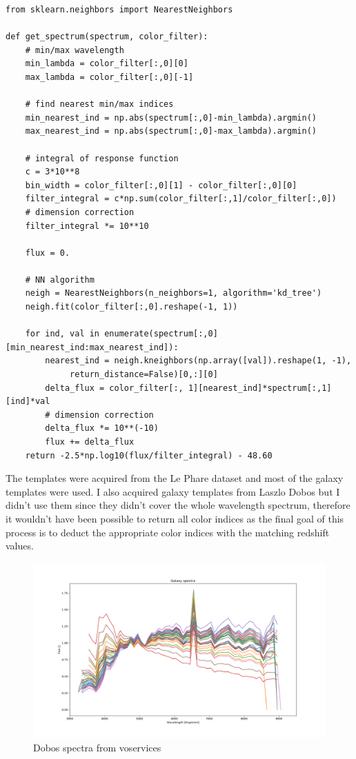 \documentclass[a4paper,12pt]{article}
\begin{document}
\lstset{language=Python}
\lstset{frame=lines}
\lstset{basicstyle=\scriptsize}
\begin{lstlisting}
from sklearn.neighbors import NearestNeighbors

def get_spectrum(spectrum, color_filter):
	# min/max wavelength
	min_lambda = color_filter[:,0][0]
	max_lambda = color_filter[:,0][-1]
		
	# find nearest min/max indices
	min_nearest_ind = np.abs(spectrum[:,0]-min_lambda).argmin()
	max_nearest_ind = np.abs(spectrum[:,0]-max_lambda).argmin()
		
	# integral of response function
	c = 3*10**8
	bin_width = color_filter[:,0][1] - color_filter[:,0][0]
	filter_integral = c*np.sum(color_filter[:,1]/color_filter[:,0])
	# dimension correction
	filter_integral *= 10**10
		
	flux = 0.
		
	# NN algorithm
	neigh = NearestNeighbors(n_neighbors=1, algorithm='kd_tree')
	neigh.fit(color_filter[:,0].reshape(-1, 1))
		
	for ind, val in enumerate(spectrum[:,0][min_nearest_ind:max_nearest_ind]):
		nearest_ind = neigh.kneighbors(np.array([val]).reshape(1, -1),
			 return_distance=False)[0,:][0]
		delta_flux = color_filter[:, 1][nearest_ind]*spectrum[:,1][ind]*val
		# dimension correction
		delta_flux *= 10**(-10)
		flux += delta_flux
	return -2.5*np.log10(flux/filter_integral) - 48.60
\end{lstlisting}

\par The templates were acquired from the Le Phare \cite{lephare} 
dataset and most of the galaxy templates were used. I also acquired
galaxy templates from Laszlo Dobos but I didn't use them since they 
didn't cover the whole wavelength spectrum, therefore it wouldn't have 
been possible to return all color indices as the final goal of this 
process is to deduct the appropriate color indices with the matching
redshift values.

\begin{figure}[H]
	\centering
	\includegraphics[width=.8\textwidth]{./dobos-spectra.png}
	\caption{ Dobos spectra from voservices }
\end{figure}
\end{document}
